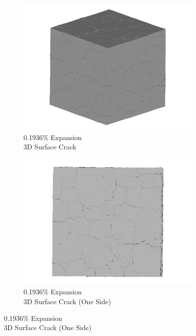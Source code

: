 \begin{figure}[ht!]
    \begin{subfigure}{.5\textwidth}
      \centering
      \includegraphics[width=0.5\linewidth]{Files/exp_3D/ASR/A30P75_2_3d.png}
      \caption{0.1936\% Expansion\\3D Surface Crack}
    \end{subfigure}%
    \begin{subfigure}{.5\textwidth}
      \centering
      \includegraphics[width=0.5\linewidth]{Files/exp_3D/ASR/A30P75_2_3ds.png}
      \caption{0.1936\% Expansion\\3D Surface Crack (One Side)}
    \end{subfigure}%


\end{figure}
